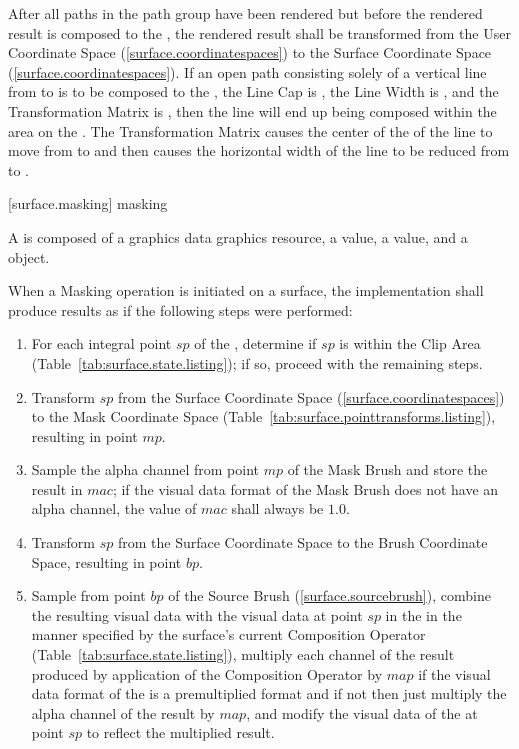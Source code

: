 \pnum
After all paths in the path group have been rendered but before the rendered result is composed to the \underlyingsurface, the rendered result shall be transformed from the User Coordinate Space (\ref{surface.coordinatespaces}) to the Surface Coordinate Space (\ref{surface.coordinatespaces}).
\enterexample
If an open path consisting solely of a vertical line from  to  is to be composed to the \underlyingsurface, the Line Cap is , the Line Width is , and the Transformation Matrix is , then the line will end up being composed within the area  on the \underlyingsurface. The Transformation Matrix causes the center of the \xaxis of the line to move from  to  and then causes the horizontal width of the line to be reduced from  to .
\exitexample

 [surface.masking] { masking}

\pnum
A  is composed of a graphics data graphics resource, a  value, a  value, and a  object.

\pnum
When a Masking operation is initiated on a surface, the implementation shall produce results as if the following steps were performed:

\begin{enumerate}
\item For each integral point $sp$ of the \underlyingsurface, determine if $sp$ is within the Clip Area (Table~\ref{tab:surface.state.listing}); if so, proceed with the remaining steps.
\item Transform $sp$ from the Surface Coordinate Space (\ref{surface.coordinatespaces}) to the Mask Coordinate Space (Table~\ref{tab:surface.pointtransforms.listing}), resulting in point $mp$.
\item Sample the alpha channel from point $mp$ of the Mask Brush and store the result in $mac$; if the visual data format of the Mask Brush does not have an alpha channel, the value of $mac$ shall always be $1.0$.
\item Transform $sp$ from the Surface Coordinate Space to the Brush Coordinate Space, resulting in point $bp$.
\item Sample from point $bp$ of the Source Brush (\ref{surface.sourcebrush}), combine the resulting visual data with the visual data at point $sp$ in the \underlyingsurface in the manner specified by the surface's current Composition Operator (Table~\ref{tab:surface.state.listing}), multiply each channel of the result produced by application of the Composition Operator by $map$ if the visual data format of the \underlyingsurface is a premultiplied format and if not then just multiply the alpha channel of the result by $map$, and modify the visual data of the \underlyingsurface at point $sp$ to reflect the multiplied result.
\end{enumerate}

